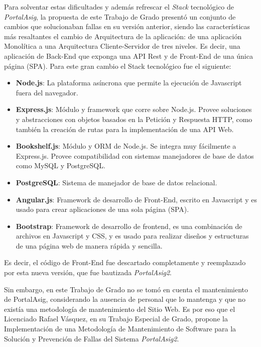     Para solventar estas dificultades y además refrescar el \textit{Stack} tecnológico de \textit{PortalAsig}, la propuesta de este Trabajo de Grado presentó un conjunto de cambios que solucionaban fallas en su versión anterior, siendo las características más resaltantes el cambio de Arquitectura de la aplicación: de una aplicación Monolítica a una Arquitectura Cliente-Servidor de tres niveles. Es decir, una aplicación de Back-End que exponga una API Rest y de Front-End de una única página (SPA). Para este gran cambio el Stack tecnológico fue el siguiente:
    \begin{itemize}
        \item \textbf{Node.js}: La plataforma asíncrona que permite la ejecución de Javascript fuera del navegador.
        \item\textbf{Express.js}: Módulo y framework que corre sobre Node.js. Provee soluciones y abstracciones con objetos basados en la Petición y Respuesta HTTP, como también la creación de rutas para la implementación de una API Web.
        \item \textbf{Bookshelf.js}: Módulo y ORM de Node.js. Se integra muy fácilmente a Express.js. Provee compatibilidad con sistemas manejadores de base de datos como MySQL y PostgreSQL.
        \item \textbf{PostgreSQL}: Sistema de manejador de base de datos relacional.
        \item \textbf{Angular.js}: Framework de desarrollo de Front-End, escrito en Javascript y es usado para crear aplicaciones de una sola página (SPA).
        \item \textbf{Bootstrap}: Framework de desarrollo de frontend, es una combinación de archivos en Javascript y CSS, y es usado para realizar diseños y estructuras de una página web de manera rápida y sencilla.
    \end{itemize}

    Es decir, el código de Front-End fue descartado completamente y reemplazado por esta nueva versión, que fue bautizada \textit{PortalAsig2}.  \cite{portalasig_2}

    Sin embargo, en este Trabajo de Grado no se tomó en cuenta el mantenimiento de PortalAsig, considerando la ausencia de personal que lo mantenga y que no existía una metodología de mantenimiento del Sitio Web.
    Es por eso que el Licenciado Rafael Vásquez, en su Trabajo Especial de Grado, propone la Implementación de una Metodología de Mantenimiento de Software para la Solución y Prevención de Fallas del Sistema \textit{PortalAsig2}.

